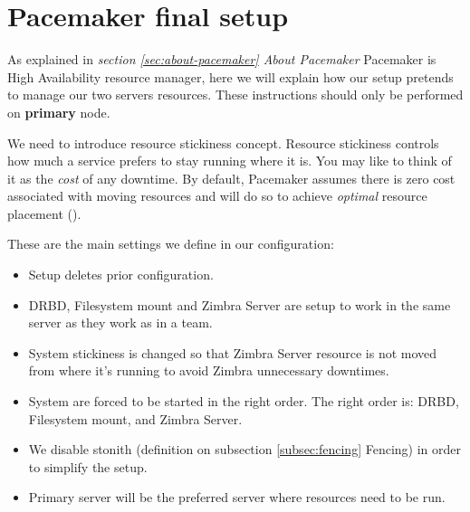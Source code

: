 \section {\label{sec:pacemaker-final-setup}Pacemaker final setup}
As explained in \textit{section \ref{sec:about-pacemaker} About Pacemaker} Pacemaker is High Availability resource manager, here we will explain how our setup pretends to manage our two servers resources. These instructions should only be performed on \textbf{primary} node.

We need to introduce resource stickiness concept. Resource stickiness controls how much a service prefers to stay running where it is. You may like to think of it as the \textit{cost} of any downtime. By default, Pacemaker assumes there is zero cost associated with moving resources and will do so to achieve \textit{optimal} resource placement (\cite{ClustersFromScratch}).

These are the main settings we define in our configuration:
\begin{itemize}
  \item Setup deletes prior configuration.
  \item DRBD, Filesystem mount and Zimbra Server are setup to work in the same server as they work as in a team.
  \item System stickiness is changed so that Zimbra Server resource is not moved from where it's running to avoid Zimbra unnecessary downtimes.
  \item System are forced to be started in the right order. The right order is: DRBD, Filesystem mount, and Zimbra Server.
  \item We disable stonith (definition on subsection {\ref{subsec:fencing} Fencing}) in order to simplify the setup.
  \item Primary server will be the preferred server where resources need to be run.
\end{itemize}

